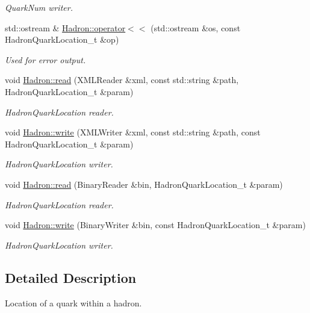 \begin{DoxyCompactItemize}
\begin{DoxyCompactList}\small\item\em Quark\+Num writer. \end{DoxyCompactList}\item 
std\+::ostream \& \mbox{\hyperlink{namespaceHadron_a16e2cbe171cccf191439c38f7ce36655}{Hadron\+::operator$<$$<$}} (std\+::ostream \&os, const Hadron\+Quark\+Location\+\_\+t \&op)
\begin{DoxyCompactList}\small\item\em Used for error output. \end{DoxyCompactList}\item 
void \mbox{\hyperlink{namespaceHadron_a48b9ff1049a4c339c032065b538ed41f}{Hadron\+::read}} (X\+M\+L\+Reader \&xml, const std\+::string \&path, Hadron\+Quark\+Location\+\_\+t \&param)
\begin{DoxyCompactList}\small\item\em Hadron\+Quark\+Location reader. \end{DoxyCompactList}\item 
void \mbox{\hyperlink{namespaceHadron_a2737e3c3e39c76c6dbe81ce5e484f6cc}{Hadron\+::write}} (X\+M\+L\+Writer \&xml, const std\+::string \&path, const Hadron\+Quark\+Location\+\_\+t \&param)
\begin{DoxyCompactList}\small\item\em Hadron\+Quark\+Location writer. \end{DoxyCompactList}\item 
void \mbox{\hyperlink{namespaceHadron_a6860ee691eb6d64d0fb2d52f4977316b}{Hadron\+::read}} (Binary\+Reader \&bin, Hadron\+Quark\+Location\+\_\+t \&param)
\begin{DoxyCompactList}\small\item\em Hadron\+Quark\+Location reader. \end{DoxyCompactList}\item 
void \mbox{\hyperlink{namespaceHadron_a8953a24e53ffe4d60e9c0ba26a48a9e3}{Hadron\+::write}} (Binary\+Writer \&bin, const Hadron\+Quark\+Location\+\_\+t \&param)
\begin{DoxyCompactList}\small\item\em Hadron\+Quark\+Location writer. \end{DoxyCompactList}\end{DoxyCompactItemize}


\subsection{Detailed Description}
Location of a quark within a hadron. 

